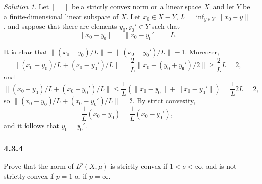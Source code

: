 \documentclass{report}
\newcommand{\norm}[1]{{\lVert #1 \rVert}}
\theoremstyle{remark}
\newtheorem*{solution}{Solution}
\begin{document}
\begin{solution}
  Let $\norm{\phantom x}$ be a strictly convex norm on a linear space $X$, and let $Y$ be a finite-dimensional linear subspace of $X$. Let $x_0 \in X - Y$,  $L = \inf_{y \in Y} \norm{x_0 - y}$, and suppose that there are elements $y_0, y_0' \in Y$ such that
  \begin{equation*}
    \norm{x_0 - y_0} = \norm{x_0 - y_0'} = L.
  \end{equation*}

  It is clear that $\norm{(x_0 - y_0)/L} = \norm{(x_0 - y_0')/L} = 1$. Moreover,
  \begin{equation*}
    \norm{(x_0 - y_0)/L + (x_0 - y_0')/L} = \frac{2}{L} \norm{x_0 - (y_0 + y_0')/2} \ge \frac{2}{L} L = 2,
  \end{equation*}
  and
  \begin{equation*}
    \norm{(x_0 - y_0)/L + (x_0 - y_0')/L} \le \frac{1}{L} \left( \norm{x_0 - y_0} + \norm{x_0 - y_0'} \right) = \frac{1}{L} 2L = 2,
  \end{equation*}
  so $\norm{(x_0 - y_0)/L + (x_0 - y_0')/L} = 2$. By strict convexity,
  \begin{equation*}
    \frac{1}{L} (x_0 - y_0) = \frac{1}{L} (x_0 - y_0'),
  \end{equation*}
  and it follows that $y_0 = y_0'$.
\end{solution}

\subsubsection*{4.3.4}
Prove that the norm of $L^p(X,\mu)$ is strictly convex if $1 < p < \infty$, and is not strictly convex if $p = 1$ or if $p = \infty$.
\end{document}
